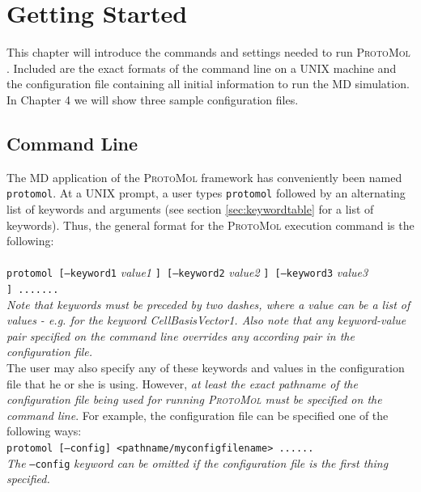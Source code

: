 \documentclass[11pt]{report}
\newcommand{\ProtoMol}{\textsc{ProtoMol }}
\providecommand{\ttsmall}[1]{\texttt{\small\mbox{#1}}}
\begin{document}
\chapter{Getting Started}

This chapter will introduce the commands and settings needed to run
\ProtoMol.  Included are the exact formats of the command line on a
UNIX machine and the configuration file containing all initial
information to run the MD simulation.  In Chapter 4 we will show three
sample configuration files.


\section{Command Line}

The MD application of the \ProtoMol framework has conveniently been
named \ttsmall{protomol}.  At a UNIX prompt, a user types
\ttsmall{protomol} followed by an alternating list of keywords and
arguments (see section \ref{sec:keywordtable} for a list of keywords).  Thus, the
general format for the \ProtoMol execution command is the following:\\
\\
\ttsmall{protomol [--keyword1}
{\it value1}
\ttsmall{] [--keyword2}
{\it value2}
\ttsmall{] [--keyword3}
{\it value3}
\ttsmall{] .......}\\

{\it Note that keywords must be preceded by two dashes, where a value
can be a list of values - e.g. for the keyword CellBasisVector1.  Also
note that any keyword-value pair specified on the command line
overrides any according pair in the configuration file.}\\


The user may also specify any of these keywords and values in the
configuration file that he or she is using.  However,  {\it at least the
exact pathname of the configuration file being used for running
\ProtoMol must be specified on the command line}. For example, the configuration file
can be specified one of the following ways: \\


\ttsmall{protomol [--config] <pathname/myconfigfilename>
......}\\

{\it The }\ttsmall{--config} {\it keyword can be omitted
if the configuration file is the first thing specified.}\\
\end{document}

